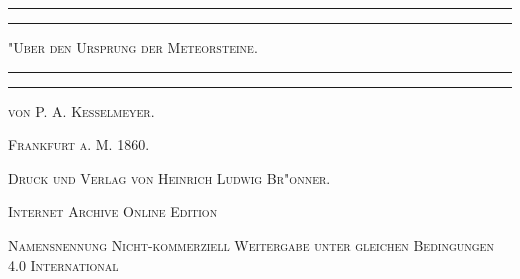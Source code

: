 \documentclass[a4paper, 8pt, oneside, polutonikogreek, german]{article}
\begin{document}
\begin{titlepage} %
	\centering %

	
	\rule{\textwidth}{1.6pt}\vspace*{-\baselineskip}\vspace*{2pt} %
	\rule{\textwidth}{0.4pt} %
	
	\vspace{1\baselineskip} %
	
	{\scshape\LARGE "Uber den Ursprung der Meteorsteine.}
	
	\vspace{1\baselineskip} %

	\rule{\textwidth}{0.4pt}\vspace*{-\baselineskip}\vspace{3.2pt} %
	\rule{\textwidth}{1.6pt} %
	
	\vspace{1\baselineskip} %
	
	
	{\scshape von P. A. Kesselmeyer.} %
	
	\vspace*{1\baselineskip} %
    
    \vspace*{\fill}

	\vspace{1\baselineskip}

	{\small\scshape Frankfurt a. M. 1860.}
	
	{\small\scshape{Druck und Verlag von Heinrich Ludwig Br"onner.}}
	
	\vspace{0.5\baselineskip} %

    \scshape Internet Archive Online Edition  %
	
	{\scshape\small Namensnennung Nicht-kommerziell Weitergabe unter gleichen Bedingungen 4.0 International} %
\end{titlepage}
\setlength{\parskip}{1mm plus1mm minus1mm}
\clearpage
\tableofcontents
\clearpage
\end{document}
